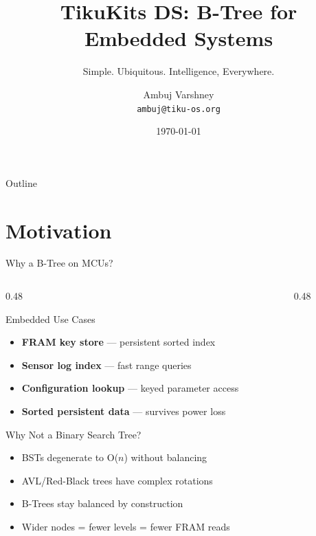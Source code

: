 \documentclass[aspectratio=169, 10pt]{beamer}
\title[TikuKits DS]{TikuKits DS: B-Tree for Embedded Systems}
\subtitle{Simple. Ubiquitous. Intelligence, Everywhere.}
\author[Ambuj Varshney]{Ambuj Varshney \\ \texttt{ambuj@tiku-os.org}}
\date{\today}
\begin{document}
\begin{frame}
\titlepage
\end{frame}

\begin{frame}{Outline}
\tableofcontents
\end{frame}

\section{Motivation}

\begin{frame}{Why a B-Tree on MCUs?}
\begin{columns}[T]
\begin{column}{0.48\textwidth}
\begin{block}{Embedded Use Cases}
\begin{itemize}
  \item \textbf{FRAM key store} --- persistent sorted index
  \item \textbf{Sensor log index} --- fast range queries
  \item \textbf{Configuration lookup} --- keyed parameter access
  \item \textbf{Sorted persistent data} --- survives power loss
\end{itemize}
\end{block}

\begin{block}{Why Not a Binary Search Tree?}
\begin{itemize}
  \item BSTs degenerate to O($n$) without balancing
  \item AVL/Red-Black trees have complex rotations
  \item B-Trees stay balanced by construction
  \item Wider nodes = fewer levels = fewer FRAM reads
\end{itemize}
\end{block}
\end{column}

\begin{column}{0.48\textwidth}
\begin{center}
\end{center}


\end{column}
\end{columns}
\end{frame}
\end{document}
